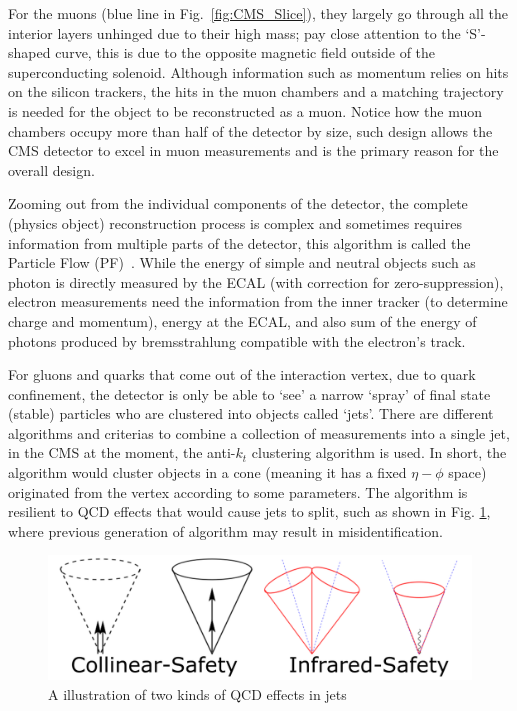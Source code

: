 For the muons (blue line in Fig.~\ref{fig:CMS_Slice}), they largely go through all the interior layers unhinged due to their
high mass; pay close attention to the `S'-shaped curve, this is due to the opposite magnetic
field outside of the superconducting solenoid. Although information such as momentum relies on
hits on the silicon trackers, the hits in the muon chambers and a matching trajectory is needed 
for the object to be reconstructed as a muon. Notice how the
muon chambers occupy more than half of the detector by size, such design allows the CMS 
detector to excel in muon measurements and is the primary reason for the overall design.

Zooming out from the individual components of the detector, the complete (physics object) reconstruction
process is complex and sometimes requires information from multiple parts of the detector, this
algorithm is called the Particle Flow (PF)~\cite{particle_flow}. While the energy of simple and neutral 
objects such as photon is directly measured by the ECAL (with correction for zero-suppression), electron measurements
need the information from the inner tracker (to determine charge and momentum), energy at the ECAL, and
also sum of the energy of photons produced by bremsstrahlung compatible with the electron's track.

For gluons and quarks that come out of the interaction vertex, due to quark confinement, the detector 
is only be able to `see' a narrow `spray' of final state (stable) particles who are clustered into objects
called `jets'.
There are different algorithms and criterias to combine a collection of measurements into a single jet,
in the CMS at the moment, the anti-$k_t$ clustering algorithm is used. In short, the algorithm would cluster objects
in a cone (meaning it has a fixed $\eta-\phi$ space) originated from the vertex according to some parameters.
The algorithm is resilient to QCD effects that would cause jets to split, such as shown in Fig.
\ref{fig:jet_split}, where previous generation of algorithm may result in misidentification.

\begin{figure}[htb]
\begin{center}
\includegraphics[width=.85\linewidth]{fig/jet_split.png}
\end{center}
\caption{A illustration of two kinds of QCD effects in jets\protect\footnotemark}
\label{fig:jet_split}
\end{figure}

